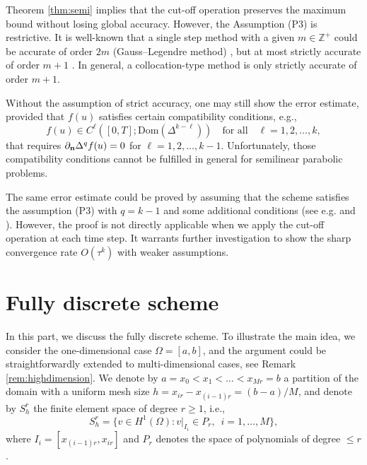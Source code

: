 \begin{remark}\label{remark:p3}
Theorem \ref{thm:semi} implies that the cut-off operation preserves the maximum bound
without losing global accuracy. However, the Assumption (P3) is restrictive. It is well-known that a single step method
with a given $m \in \mathbb{Z}^+$ could be accurate of order $2m$ (Gauss--Legendre method) \cite[Section 2.2]{Ehle:thesis},
but at most strictly accurate of order $m+1$ \cite[Lemma 5]{BrennerCrouzeixThomee:1982}.
In general, a collocation-type method is only strictly accurate of order $m+1$.

Without the assumption of strict accuracy,  one may still show the error estimate,
provided that $f(u)$ satisfies certain compatibility conditions, e.g.,
$$ f(u) \in C^{\ell}([0,T]; \text{Dom}(\Delta^{k-\ell}))\quad \text{for all} \quad \ell=1,2,\ldots,k,$$
that requires
 $\partial_{\bf n} \Delta^q f(u) = 0$ for $\ell=1,2,\ldots,k-1$.
Unfortunately, those compatibility conditions cannot be fulfilled in general for semilinear parabolic problems.
\end{remark}

\begin{remark}\label{remark:p3-2}
The same error estimate could be proved by
assuming that the scheme satisfies the assumption (P3)
with $q=k-1$ and some additional conditions
(see e.g. \cite[Theorem 8.4]{Thomee:2006} and \cite{OstermannRoche:1992}).
However, the proof is not directly applicable when we apply the cut-off operation at each time step.
It warrants further investigation to show the sharp convergence rate $O(\tau^k)$ with weaker assumptions.
\end{remark}



\section{Fully discrete scheme}\label{ssec:fully}
In this part, we discuss the fully discrete scheme. To illustrate the
main idea, we consider the one-dimensional case $\Omega=[a,b]$,
and the argument could be straightforwardly extended to multi-dimensional cases, see Remark \ref{rem:highdimension}.
We denote by $a=x_0<x_{1}<\dots<x_{Mr}=b$ a partition of the domain with a uniform mesh size $h=x_{ir} - x_{(i-1)r} = (b-a)/M$,
and denote by $S_h^r$ the finite element space of degree $r\ge 1$, i.e.,
$$
S_h^r=\{v\in H^1(\Omega): v|_{I_i}\in P_r,\,\,\, i=1,\dots,M\} ,
$$
where $I_i=[x_{(i-1)r},x_{ir}]$ and $P_r$ denotes the space of polynomials of degree $\le r$.

